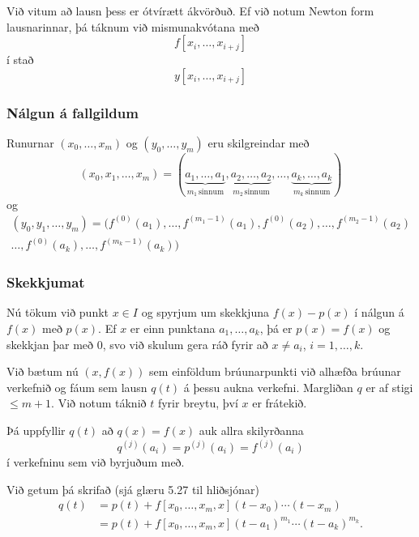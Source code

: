 \documentclass[icelandic,a4paper,12pt]{article}
\begin{document}
\pause
\smallskip
Við vitum að lausn þess er ótvírætt ákvörðuð.  Ef við notum Newton
form lausnarinnar, þá táknum við mismunakvótana með
$$
f[x_i,\ldots,x_{i+j}]
$$
í stað 
$$
y[x_i,\ldots,x_{i+j}]
$$


\subsubsection{Nálgun á fallgildum} 
Runurnar $(x_0,\ldots,x_m)$ og 
$(y_0,\ldots,y_m)$ eru skilgreindar með 
\begin{equation*}
  (x_0,x_1,\ldots,x_m) = 
  (\underbrace{a_1, \ldots, a_1}_{m_1 \, \text{sinnum}}, 
  \underbrace{a_2, \ldots , a_2}_{m_2 \, \text{sinnum}}, 
  \ldots , 
  \underbrace{a_k, \ldots , a_k}_{m_k \, \text{sinnum}}) 
\end{equation*}
og
\begin{multline*}
  (y_0,y_1,\ldots,y_m) = 
  (f^{(0)}(a_1), \ldots, f^{(m_1-1)}(a_1),
f^{(0)}(a_2), \ldots, f^{(m_2-1)}(a_2) \\ \ldots,
  f^{(0)}(a_k), \ldots, f^{(m_k-1)}(a_k))
  \label{bru.margfald.5}
\end{multline*}


\subsubsection{Skekkjumat} 
Nú tökum við punkt $x \in I$ og spyrjum um skekkjuna 
$f(x) - p(x)$ í nálgun á $f(x)$ með $p(x)$. Ef $x$ er einn punktana 
$a_1, \ldots, a_k$, þá er $p(x) = f(x)$ og skekkjan þar með 0, svo 
við skulum gera ráð fyrir að $x \not= a_i$, $i = 1, \ldots, k$.

\pause
\smallskip
Við bætum nú $(x,f(x))$ sem einföldum brúunarpunkti við
alhæfða brúunar verkefnið  og fáum sem lausn $q(t)$ á þessu aukna verkefni. 
Margliðan $q$ er af stigi $\leq m+1$. Við notum táknið $t$ fyrir 
breytu, því $x$ er frátekið. 

\pause
\smallskip
Þá uppfyllir $q(t)$ að $q(x) = f(x)$ 
auk allra skilyrðanna 
$$
q^{(j)}(a_i) = p^{(j)}(a_i) = f^{(j)}(a_i)
$$ 
í verkefninu sem við byrjuðum með.


Við getum þá skrifað (sjá glæru 5.27 til hliðsjónar)
\begin{align*}
  q(t) &= p(t) + f[x_0,\ldots,x_m,x](t-x_0)\cdots(t-x_m) \\
  &= p(t) + f[x_0,\ldots,x_m,x](t-a_1)^{m_1}\cdots(t-a_k)^{m_k}.
\end{align*}
\end{document}
